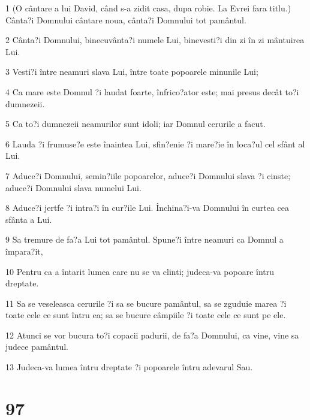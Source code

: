 \par 1 (O cântare a lui David, când s-a zidit casa, dupa robie. La Evrei fara titlu.) Cânta?i Domnului cântare noua, cânta?i Domnului tot pamântul.
\par 2 Cânta?i Domnului, binecuvânta?i numele Lui, binevesti?i din zi în zi mântuirea Lui.
\par 3 Vesti?i între neamuri slava Lui, între toate popoarele minunile Lui;
\par 4 Ca mare este Domnul ?i laudat foarte, înfrico?ator este; mai presus decât to?i dumnezeii.
\par 5 Ca to?i dumnezeii neamurilor sunt idoli; iar Domnul cerurile a facut.
\par 6 Lauda ?i frumuse?e este înaintea Lui, sfin?enie ?i mare?ie în loca?ul cel sfânt al Lui.
\par 7 Aduce?i Domnului, semin?iile popoarelor, aduce?i Domnului slava ?i cinste; aduce?i Domnului slava numelui Lui.
\par 8 Aduce?i jertfe ?i intra?i în cur?ile Lui. Închina?i-va Domnului în curtea cea sfânta a Lui.
\par 9 Sa tremure de fa?a Lui tot pamântul. Spune?i între neamuri ca Domnul a împara?it,
\par 10 Pentru ca a întarit lumea care nu se va clinti; judeca-va popoare întru dreptate.
\par 11 Sa se veseleasca cerurile ?i sa se bucure pamântul, sa se zguduie marea ?i toate cele ce sunt întru ea; sa se bucure câmpiile ?i toate cele ce sunt pe ele.
\par 12 Atunci se vor bucura to?i copacii padurii, de fa?a Domnului, ca vine, vine sa judece pamântul.
\par 13 Judeca-va lumea întru dreptate ?i popoarele întru adevarul Sau.

\chapter{97}


